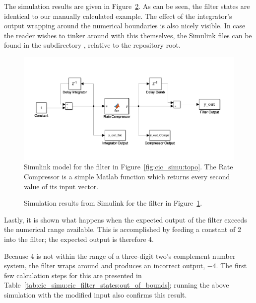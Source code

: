 The          simulation         results          are         given          in
Figure~\ref{fig:cic_simu:simulink_results}. As   can  be   seen,  the   filter
states  are  identical  to  our manually  calculated  example. The  effect  of
the  integrator's   output  wrapping   around  the  numerical   boundaries  is
also  nicely  visible. In  case  the  reader  wishes  to  tinker  around  with
this  themselves,  the  Simulink  files  can  be  found  in  the  subdirectory
, relative to the repository root.

\begin{figure}
    \centering
    \includegraphics[width=\textwidth]{images/cicSimu/simulink.png}
    \caption[Simulink Filter Model]{%
        Simulink model  for the filter  in Figure~\ref{fig:cic_simu:topo}. The
        Rate   Compressor is  a  simple Matlab  function  which returns  every
        second value of its input vector.%
    }
    \label{fig:cic_simu:simulink_model}
\end{figure}

\begin{figure}
    \centering
    
    \caption[Simulink Simulation Results]{%
        Simulation    results    from    Simulink   for    the    filter    in
        Figure~\ref{fig:cic_simu:simulink_model}.%
    }
    \label{fig:cic_simu:simulink_results}
\end{figure}

Lastly,  it is  shown what  happens  when the  expected output  of the  filter
exceeds  the numerical  range  available. This is  accomplished  by feeding  a
constant of \num{2} into the filter; the expected output is therefore \num{4}.

Because \num{4}  is not  within the  range of  a three-digit  two's complement
number  system, the  filter wraps  around  and produces  an incorrect  output,
\num{-4}.   The  first  few  calculation  steps  for  this  are  presented  in
Table~\ref{tab:cic_simu:cic_filter_states:out_of_bounds};  running  the  above
simulation with the modified input also confirms this result.

